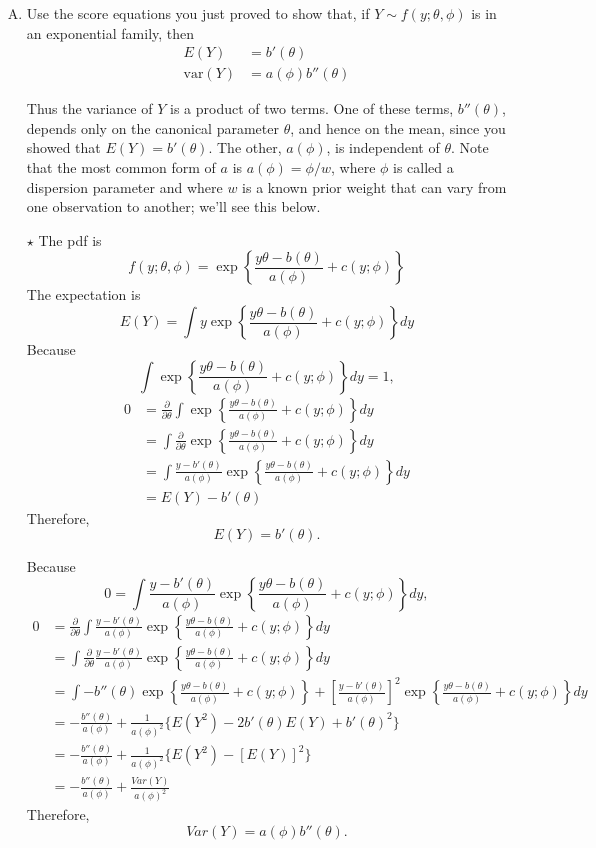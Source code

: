 \documentclass[11pt]{article}
\newcommand{\jie}{$\star$ }
\begin{document}
\begin{enumerate}[(A)]
\item Use the score equations you just proved to show that, if $Y \sim f(y; \theta, \phi)$ is in an exponential family, then
$$
\begin{aligned}
E(Y) &=  b'(\theta) \\
\mbox{var} ( Y ) &= a(\phi) b''(\theta) 
\end{aligned}
$$

Thus the variance of $Y$ is a product of two terms.  One of these terms, $b''(\theta)$, depends only on the canonical parameter $\theta$, and hence on the mean, since you showed that $E(Y) =  b'(\theta)$.  The other, $a(\phi)$, is independent of $\theta$.  Note that the most common form of $a$ is $a(\phi) = \phi/w$, where $\phi$ is called a dispersion parameter and where $w$ is a known prior weight that can vary from one observation to another; we'll see this below.  

\bigskip
\jie
The pdf is
$$
f(y; \theta, \phi) = \exp \left\{ \frac{y \theta - b(\theta)}{a(\phi)} + c(y; \phi)   \right \}
$$
The expectation is
$$
E(Y) = \int y \exp \left\{ \frac{y \theta - b(\theta)}{a(\phi)} + c(y; \phi)   \right \} dy
$$
Because
$$ \int \exp \left\{ \frac{y \theta - b(\theta)}{a(\phi)} + c(y; \phi)   \right \} dy = 1,$$
\begin{align*}
    0 &= \frac{\partial}{\partial \theta} \int \exp \left\{ \frac{y \theta - b(\theta)}{a(\phi)} + c(y; \phi)   \right \} dy \\
    &= \int \frac{\partial}{\partial \theta}  \exp \left\{ \frac{y \theta - b(\theta)}{a(\phi)} + c(y; \phi)   \right \} dy \\
    &= \int \frac{y - b'(\theta)}{a(\phi)}  \exp \left\{ \frac{y \theta - b(\theta)}{a(\phi)} + c(y; \phi)   \right \} dy \\
    &= E(Y) - b'(\theta)
\end{align*}
Therefore,
$$E(Y) = b'(\theta).$$

Because
$$0 = \int \frac{y - b'(\theta)}{a(\phi)}  \exp \left\{ \frac{y \theta - b(\theta)}{a(\phi)} + c(y; \phi)   \right \} dy,$$
\begin{align*}
    0 &= \frac{\partial}{\partial \theta} \int \frac{y - b'(\theta)}{a(\phi)}  \exp \left\{ \frac{y \theta - b(\theta)}{a(\phi)} + c(y; \phi)   \right \} dy \\
    &= \int \frac{\partial}{\partial \theta} \frac{y - b'(\theta)}{a(\phi)}  \exp \left\{ \frac{y \theta - b(\theta)}{a(\phi)} + c(y; \phi)   \right \} dy\\
    &= \int -b''(\theta)  \exp \left\{ \frac{y \theta - b(\theta)}{a(\phi)} + c(y; \phi)   \right \} + \left[ \frac{y - b'(\theta)}{a(\phi)} \right]^2  \exp \left\{ \frac{y \theta - b(\theta)}{a(\phi)} + c(y; \phi)   \right \} dy \\
    &= -\frac{b''(\theta)}{a(\phi)} + \frac{1}{a(\phi)^2} \{ E(Y^2) -  2b'(\theta)E(Y) + b'(\theta)^2 \} \\
    &= -\frac{b''(\theta)}{a(\phi)} + \frac{1}{a(\phi)^2} \{ E(Y^2) -  [E(Y)]^2 \} \\
    &= -\frac{b''(\theta)}{a(\phi)} + \frac{Var(Y)}{a(\phi)^2}
\end{align*}
Therefore,
$$Var(Y) = a(\phi)b''(\theta).$$


\end{enumerate}
\end{document}

